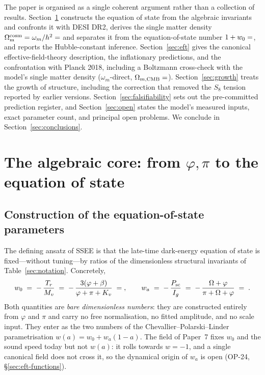 \documentclass[a4paper,11pt]{article}
\newcommand{\Om}{\Omega_{\mathrm{m}}}
\begin{document}
The paper is organised as a single coherent argument rather than a collection of
results. Section~\ref{sec:core} constructs the equation of state from the
algebraic invariants and confronts it with DESI DR2, derives the single matter density
$\Om^{\mathrm{cosm}}=\omega_m/h^2=\val{OMEGA_M_TOTAL_d6}$ and separates it from the
equation-of-state number $1+w_0=\val{S_M_d6}$, and
reports the Hubble-constant inference. Section~\ref{sec:eft} gives the canonical
effective-field-theory description, the inflationary predictions, and the
confrontation with Planck 2018, including a Boltzmann cross-check with the model's single matter density
($\omega_m$-direct, $\Omega_{m,\rm CMB}=\val{OMEGA_M_TOTAL_d6}$). Section~\ref{sec:growth} treats
the growth of structure, including the correction that removed the $S_8$ tension reported by earlier versions.
Section~\ref{sec:falsifiability} sets out the pre-committed prediction register,
and Section~\ref{sec:open} states the model's measured inputs, exact parameter
count, and principal open problems. We conclude in
Section~\ref{sec:conclusions}.

\section{The algebraic core: from $\varphi,\pi$ to the equation of state}
\label{sec:core}

\subsection{Construction of the equation-of-state parameters}
\label{sec:w0wa-construction}
The defining ansatz of SSEE is that the late-time dark-energy equation of
state is fixed---without tuning---by ratios of the dimensionless structural
invariants of Table~\ref{sec:notation}. Concretely,
\begin{equation}
  w_0 \;=\; -\,\frac{T_r}{M_v}
        \;=\; -\,\frac{3(\varphi+\beta)}{\varphi+\pi+K_v}
        \;=\; \val{W0_d6},
  \qquad
  w_a \;=\; -\,\frac{P_{\mathrm{sc}}}{I_g}
        \;=\; -\,\frac{\Omega+\varphi}{\pi+\Omega+\varphi}
        \;=\; \val{WA_d5} .
  \label{eq:w0wa}
\end{equation}
Both quantities are \emph{bare dimensionless numbers}: they are constructed
entirely from $\varphi$ and $\pi$ and carry no free normalisation, no fitted
amplitude, and no scale input. They enter as the two numbers of the Chevallier--Polarski--Linder
parametrisation $w(a)=w_0+w_a(1-a)$. The field of Paper~7 fixes $w_0$ and the
sound speed today but not $w(a)$: it rolls towards $w=-1$, and a single canonical
field does not cross it, so the dynamical origin of $w_a$ is open (OP-24,
\S\ref{sec:eft-functions}).
\end{document}
